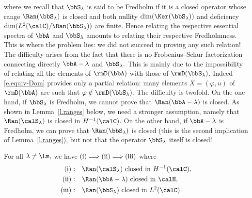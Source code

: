 where we recall that $\bbS_\lambda$ is said to be Fredholm if it is a closed operator whose range $\Ran(\bbS_\lambda)$ is closed and both nullity $\dim(\Ker(\bbS_\lambda))$ and deficiency $\dim(L^2(\calC)/\Ran(\bbS_\lambda))$ are finite. Hence relating the respective essential spectra of $\bbA$ and $\bbS_\lambda$ amounts to relating their respective Fredholmness. This is where the problem lies: we did not succeed in proving any such relation! The difficulty arises from the fact that there is no Frobenius--Schur factorization connecting directly $\bbA - \lambda$ and $\bbS_\lambda.$ This is mainly due to the impossibility of relating all the elements of $\rmD(\bbA)$ with those of $\rmD(\bbS_\lambda)$. Indeed \eqref{e.equiv-Dom} provides only a partial relation: many elements $X = (\varphi,u)$ of $\rmD(\bbA)$ are such that $\varphi \notin \rmD(\bbS_\lambda).$ The difficulty is twofold. On the one hand, if $\bbS_\lambda$ is Fredholm, we cannot prove that $\Ran(\bbA - \lambda)$ is closed. As shown in Lemma~\ref{l.ranges} below, we need a stronger assumption, namely that $\Ran(\calS_\lambda)$ is closed in $H^{-1}(\calC).$ On the other hand, if $\bbA - \lambda$ is Fredholm, we can prove that $\Ran(\bbS_\lambda)$ is closed (this is the second implication of Lemma~\ref{l.ranges}), but not that the operator $\bbS_\lambda$ itself is closed!


\begin{lemm}
For all $\lambda \neq \Lm,$ we have ${\rm (i)} \Longrightarrow {\rm (ii)} \Longrightarrow {\rm (iii)}$ where
\begin{align*}
\mathrm{(i)}: & \quad \Ran(\calS_\lambda) \text{ closed in } H^{-1}(\calC), \\
\mathrm{(ii)}: & \quad \Ran(\bbA - \lambda) \text{ closed in } \calH, \\
\mathrm{(iii)}: & \quad \Ran(\bbS_\lambda) \text{ closed in } L^2(\calC).
\end{align*}\label{l.ranges}
\end{lemm}


